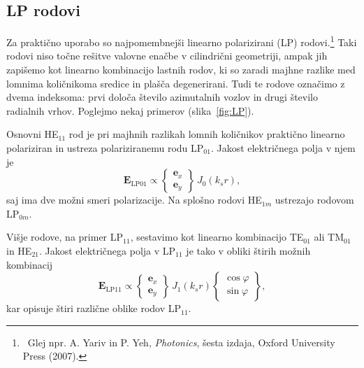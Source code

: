 \subsection*{LP rodovi}
Za praktično uporabo so najpomembnejši linearno polarizirani (LP) rodovi.\footnote{~Glej 
npr. A. Yariv in P. Yeh, {\it Photonics}, šesta izdaja, Oxford
University Press (2007).}  Taki rodovi niso
točne rešitve valovne enačbe v cilindrični geometriji, ampak jih zapišemo kot linearno 
kombinacijo lastnih rodov, ki so zaradi majhne razlike med lomnima količnikoma sredice
in plašča degenerirani. Tudi te rodove označimo z dvema indeksoma: prvi določa število azimutalnih
vozlov in drugi število radialnih vrhov. Poglejmo nekaj primerov (slika~\ref{fig:LP}).

Osnovni HE$_{11}$ rod je pri majhnih razlikah lomnih količnikov praktično linearno polariziran in ustreza polariziranemu rodu LP$_{01}$. Jakost električnega polja v njem je 
\begin{equation}
\mathbf{E}_\mathrm{LP01} \propto 
\left \{
  \begin{matrix}
  \mathbf{e}_x \\ \mathbf{e}_y 
  \end{matrix}
\right \} \, J_0(k_s r),
\end{equation}
saj ima dve možni smeri polarizacije. Na splošno rodovi HE$_{1m}$ ustrezajo rodovom LP$_{0m}$. 

Višje rodove, na primer LP$_{11}$, sestavimo kot linearno kombinacijo 
TE$_{01}$ ali TM$_{01}$ in HE$_{21}$.
Jakost električnega polja v LP$_{11}$ je tako v obliki štirih možnih kombinacij
\begin{equation}
\mathbf{E}_\mathrm{LP11} \propto \left \{
  \begin{matrix}
  \mathbf{e}_x \\ \mathbf{e}_y 
  \end{matrix}
\right \} \, J_1(k_s r)
\left \{
  \begin{matrix}
  \cos\varphi  \\ \sin\varphi 
  \end{matrix}
\right \}\!,
\end{equation}
kar opisuje štiri različne oblike rodov LP$_{11}$.

